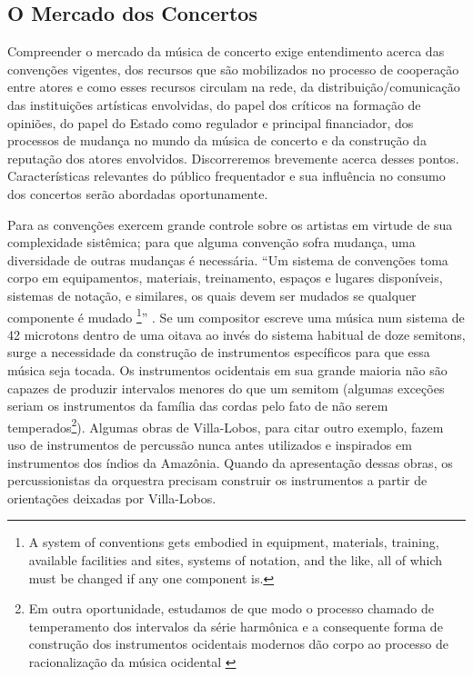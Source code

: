 \documentclass[a4paper, 12pt, openright, oneside, german, french, english, brazil]{abntex2}
\begin{document}
	\subsection{O Mercado dos Concertos}
	
	Compreender o mercado da música de concerto exige entendimento acerca das convenções vigentes, dos recursos que são mobilizados no processo de cooperação entre atores e como esses recursos circulam na rede, da distribuição/comunicação das instituições artísticas envolvidas, do papel dos críticos na formação de opiniões, do papel do Estado como regulador e principal financiador, dos processos de mudança no mundo da música de concerto e da construção da reputação dos atores envolvidos. Discorreremos brevemente acerca desses pontos. Características relevantes do público frequentador e sua influência no consumo dos concertos serão abordadas oportunamente.
	
	Para  as convenções exercem grande controle sobre os artistas em virtude de sua complexidade sistêmica; para que alguma convenção sofra mudança, uma diversidade de outras mudanças é necessária. ``Um sistema de convenções toma corpo em equipamentos, materiais, treinamento, espaços e lugares disponíveis, sistemas de notação, e similares, os quais devem ser mudados se qualquer componente é mudado \footnote{A system of conventions gets embodied in equipment, materials, training, available facilities and sites, systems of notation, and the like, all of which must be changed if any one component is.}'' \cite[p.32]{becker2008art}. Se um compositor escreve uma música num sistema de 42 microtons dentro de uma oitava ao invés do sistema habitual de doze semitons, surge a necessidade da construção de instrumentos específicos para que essa música seja tocada. Os instrumentos ocidentais em sua grande maioria não são capazes de produzir intervalos menores do que um semitom (algumas exceções seriam os instrumentos da família das cordas pelo fato de não serem temperados\footnote{Em outra oportunidade, estudamos de que modo o processo chamado de temperamento dos intervalos da série harmônica e a consequente forma de construção dos instrumentos ocidentais modernos dão corpo ao processo de racionalização da música ocidental \cite{weber1995fundamentos}}). Algumas obras de Villa-Lobos, para citar outro exemplo, fazem uso de instrumentos de percussão nunca antes utilizados e inspirados em instrumentos dos índios da Amazônia. Quando da apresentação dessas obras, os percussionistas da orquestra precisam construir os instrumentos a partir de orientações deixadas por Villa-Lobos.
	
\end{document}
